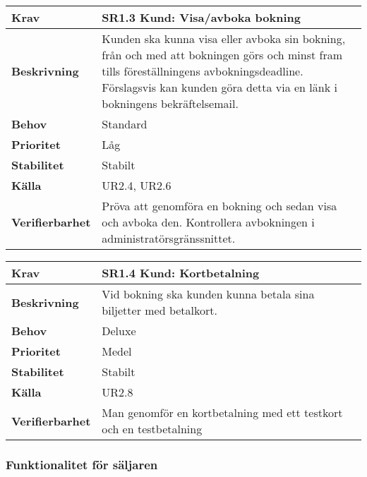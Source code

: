 \documentclass[a4paper, twoside, 11pt, titlepage]{article}
\begin{document}
		\begin {table} [ht] \begin{tabular} { p{2.6cm} p{12.5cm} }
			\hline
			\sffamily\textbf{Krav} & \sffamily\textbf{SR1.3 Kund: Visa/avboka bokning } \\
			\hline
			\sffamily\textbf{Beskrivning} & Kunden ska kunna visa eller avboka sin bokning, från och med att bokningen görs och minst fram tills föreställningens avbokningsdeadline. Förslagsvis kan kunden göra detta via en länk i bokningens bekräftelsemail.  \\
			\hline
			\sffamily\textbf{Behov} & Standard  \\
			\hline
			\sffamily\textbf{Prioritet} & Låg  \\
			\hline
			\sffamily\textbf{Stabilitet} & Stabilt  \\
			\hline
			\sffamily\textbf{Källa} & UR2.4, UR2.6  \\
			\hline
			\sffamily\textbf{Verifierbarhet} & Pröva att genomföra en bokning och sedan visa och avboka den. Kontrollera avbokningen i administratörsgränssnittet.  \\
			\hline
		\end{tabular} \end{table} \FloatBarrier
		\vspace{6mm}

		\begin {table} [ht] \begin{tabular} { p{2.6cm} p{12.5cm} }
			\hline
			\sffamily\textbf{Krav} & \sffamily\textbf{SR1.4 Kund: Kortbetalning } \\
			\hline
			\sffamily\textbf{Beskrivning} & Vid bokning ska kunden kunna betala sina biljetter med betalkort.  \\
			\hline
			\sffamily\textbf{Behov} & Deluxe  \\
			\hline
			\sffamily\textbf{Prioritet} & Medel  \\
			\hline
			\sffamily\textbf{Stabilitet} & Stabilt  \\
			\hline
			\sffamily\textbf{Källa} & UR2.8  \\
			\hline
			\sffamily\textbf{Verifierbarhet} & Man genomför en kortbetalning med ett testkort och en testbetalning  \\
			\hline
		\end{tabular} \end{table} \FloatBarrier


		\subsubsection{Funktionalitet för säljaren}
\end{document}
